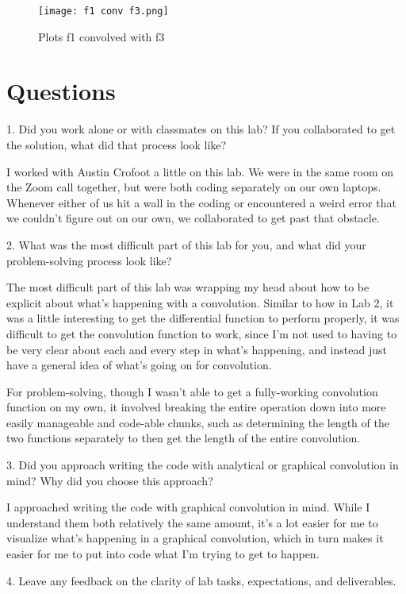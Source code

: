 \documentclass[12pt]{article}
\begin{document}
\begin{figure}[h!]
    \centering
    \texttt{[image: f1 conv f3.png]}
    \caption{Plots f1 convolved with f3}
\end{figure}

\newpage

\section{Questions}

1. Did you work alone or with classmates on this lab? If you collaborated to get the solution, what did that process look like?

I worked with Austin Crofoot a little on this lab. We were in the same room on the Zoom call together, but were both coding separately on our own laptops. Whenever either of us hit a wall in the coding or encountered a weird error that we couldn't figure out on our own, we collaborated to get past that obstacle.

2. What was the most difficult part of this lab for you, and what did your problem-solving process look like?

The most difficult part of this lab was wrapping my head about how to be explicit about what's happening with a convolution. Similar to how in Lab 2, it was a little interesting to get the differential function to perform properly, it was difficult to get the convolution function to work, since I'm not used to having to be very clear about each and every step in what's happening, and instead just have a general idea of what's going on for convolution.

For problem-solving, though I wasn't able to get a fully-working convolution function on my own, it involved breaking the entire operation down into more easily manageable and code-able chunks, such as determining the length of the two functions separately to then get the length of the entire convolution.

3. Did you approach writing the code with analytical or graphical convolution in mind? Why did you choose this approach?

I approached writing the code with graphical convolution in mind. While I understand them both relatively the same amount, it's a lot easier for me to visualize what's happening in a graphical convolution, which in turn makes it easier for me to put into code what I'm trying to get to happen.

4. Leave any feedback on the clarity of lab tasks, expectations, and deliverables.
\end{document}
